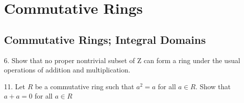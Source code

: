 \section{Commutative Rings}
\subsection{Commutative Rings; Integral Domains}
\begin{mdframed}[style=darkQuesion]
  6. Show that no proper nontrivial subset of Z can form a ring under the usual operations of addition and multiplication.
\end{mdframed}
\begin{mdframed}[style=darkAnswer,frametitle={Joe Starr}]
\end{mdframed}
\newpage
\begin{mdframed}[style=darkQuesion]
  11. Let $R$ be a commutative ring such that $a^{2}=a$ for all $a \in R .$ Show that $a+a=0$ for all $a \in R$
\end{mdframed}
\begin{mdframed}[style=darkAnswer,frametitle={Joe Starr}]
\end{mdframed}
\newpage

